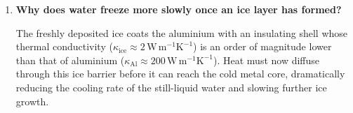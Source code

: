 \documentclass[12pt]{article}
\theoremstyle{definition} %
\theoremstyle{plain} %
\begin{document}
\begin{enumerate}
  \item \textbf{Why does water freeze more slowly once an ice layer has formed?}

        The freshly deposited ice coats the aluminium with an insulating
        shell whose thermal conductivity
        (\(\kappa_{\text{ice}}\approx 2\,\mathrm{W\,m^{-1}K^{-1}}\))
        is an order of magnitude lower than that of aluminium
        (\(\kappa_{\text{Al}}\approx 200\,\mathrm{W\,m^{-1}K^{-1}}\)).
        Heat must now diffuse through this ice barrier before it can
        reach the cold metal core, dramatically reducing the cooling rate of
        the still-liquid water and slowing further ice growth.
\end{enumerate}
\end{document}
